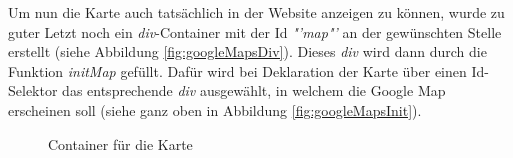 Um nun die Karte auch tatsächlich in der Website anzeigen zu können, wurde zu guter Letzt noch ein \textit{div}-Container mit der Id \textit{"'map"'} an der gewünschten Stelle erstellt (siehe Abbildung \vref{fig:googleMapsDiv}). Dieses \textit{div} wird dann durch die Funktion \textit{initMap} gefüllt. Dafür wird bei Deklaration der Karte über einen Id-Selektor das entsprechende \textit{div} ausgewählt, in welchem die Google Map erscheinen soll (siehe ganz oben in Abbildung \vref{fig:googleMapsInit}).

\begin{figure}[!h]
	\caption{Container für die Karte}
	\label{fig:googleMapsDiv}
\end{figure}

